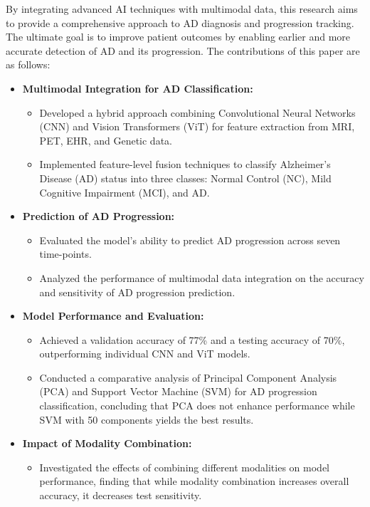 By integrating advanced AI techniques with multimodal data, this research aims to provide a comprehensive approach to AD diagnosis and progression tracking. The ultimate goal is to improve patient outcomes by enabling earlier and more accurate detection of AD and its progression. The contributions of this paper are as follows:
\begin{itemize}
    \item \textbf{Multimodal Integration for AD Classification:}
    \begin{itemize}
        \item Developed a hybrid approach combining Convolutional Neural Networks (CNN) and Vision Transformers (ViT) for feature extraction from MRI, PET, EHR, and Genetic data.
        \item Implemented feature-level fusion techniques to classify Alzheimer's Disease (AD) status into three classes: Normal Control (NC), Mild Cognitive Impairment (MCI), and AD.
    \end{itemize}
    \item \textbf{Prediction of AD Progression:}
    \begin{itemize}
        \item Evaluated the model's ability to predict AD progression across seven time-points.
        \item Analyzed the performance of multimodal data integration on the accuracy and sensitivity of AD progression prediction.
    \end{itemize}
    \item \textbf{Model Performance and Evaluation:}
    \begin{itemize}
        \item Achieved a validation accuracy of 77\% and a testing accuracy of 70\%, outperforming individual CNN and ViT models.
        \item Conducted a comparative analysis of Principal Component Analysis (PCA) and Support Vector Machine (SVM) for AD progression classification, concluding that PCA does not enhance performance while SVM with 50 components yields the best results.
    \end{itemize}
    \item \textbf{Impact of Modality Combination:}
    \begin{itemize}
        \item Investigated the effects of combining different modalities on model performance, finding that while modality combination increases overall accuracy, it decreases test sensitivity.

\end{itemize}
\end{itemize}
